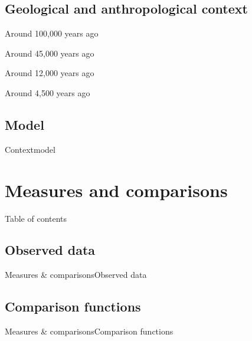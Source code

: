 \documentclass[10pt,aspectratio=43]{beamer}
\begin{document}
\subsection{Geological and anthropological context}

\begin{frame}{}{Around 100,000 years ago}
\end{frame}

\addtocounter{framenumber}{-1}
\begin{frame}{}{Around 45,000 years ago}
\end{frame}

\addtocounter{framenumber}{-1}
\begin{frame}{}{Around 12,000 years ago}
\end{frame}

\addtocounter{framenumber}{-1}
\begin{frame}{}{Around 4,500 years ago}
\end{frame}

\subsection{Model}
\masseyBrand{}{}{}{}
\begin{frame}{Context}{model}
\end{frame}


\section{Measures and comparisons}
\begin{frame}{}{Table of contents}
\tableofcontents[currentsection, subsectionstyle=show/show/hide]
\end{frame}

\masseyBrand{}{}{}{}
\subsection{Observed data}
\begin{frame}{Measures \& comparisons}{Observed data}
\end{frame}

\subsection{Comparison functions}
\begin{frame}{Measures \& comparisons}{Comparison functions}
\end{frame}
\end{document}
